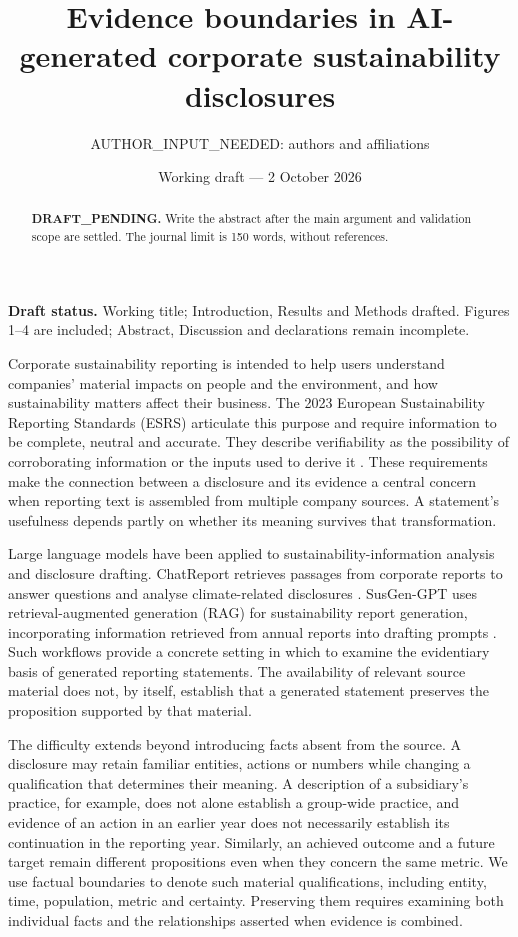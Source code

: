 \documentclass[11pt,a4paper]{article}
\title{Evidence boundaries in AI-generated corporate sustainability disclosures}
\author{\normalsize AUTHOR\_INPUT\_NEEDED: authors and affiliations}
\date{\small Working draft --- 2 October 2026}
\begin{document}
\maketitle
\begin{center}
\small\textbf{Draft status.} Working title; Introduction, Results and Methods drafted.
Figures 1--4 are included; Abstract, Discussion and declarations remain incomplete.
\end{center}

\begin{abstract}
\textbf{DRAFT\_PENDING.} Write the abstract after the main argument and validation scope are settled.
The journal limit is 150 words, without references.
\end{abstract}

Corporate sustainability reporting is intended to help users understand companies' material impacts on people and the environment, and how sustainability matters affect their business. The 2023 European Sustainability Reporting Standards (ESRS) articulate this purpose and require information to be complete, neutral and accurate. They describe verifiability as the possibility of corroborating information or the inputs used to derive it \cite{esrs2023}. These requirements make the connection between a disclosure and its evidence a central concern when reporting text is assembled from multiple company sources. A statement's usefulness depends partly on whether its meaning survives that transformation.

Large language models have been applied to sustainability-information analysis and disclosure drafting. ChatReport retrieves passages from corporate reports to answer questions and analyse climate-related disclosures \cite{chatreport2023}. SusGen-GPT uses retrieval-augmented generation (RAG) for sustainability report generation, incorporating information retrieved from annual reports into drafting prompts \cite{susgen2025}. Such workflows provide a concrete setting in which to examine the evidentiary basis of generated reporting statements. The availability of relevant source material does not, by itself, establish that a generated statement preserves the proposition supported by that material.

The difficulty extends beyond introducing facts absent from the source. A disclosure may retain familiar entities, actions or numbers while changing a qualification that determines their meaning. A description of a subsidiary's practice, for example, does not alone establish a group-wide practice, and evidence of an action in an earlier year does not necessarily establish its continuation in the reporting year. Similarly, an achieved outcome and a future target remain different propositions even when they concern the same metric. We use factual boundaries to denote such material qualifications, including entity, time, population, metric and certainty. Preserving them requires examining both individual facts and the relationships asserted when evidence is combined.
\end{document}
